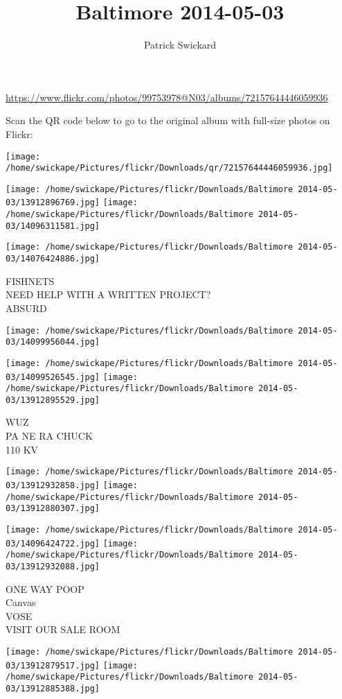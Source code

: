 \documentclass[10pt,letterpaper]{article}
\title{Baltimore 2014-05-03}
\author{Patrick Swickard}
\date{}
\begin{document}
\maketitle

\url{https://www.flickr.com/photos/99753978@N03/albums/72157644446059936}

Scan the QR code below to go to the original album with full-size photos on Flickr:

\texttt{[image: /home/swickape/Pictures/flickr/Downloads/qr/72157644446059936.jpg]}
\pagebreak

\texttt{[image: /home/swickape/Pictures/flickr/Downloads/Baltimore 2014-05-03/13912896769.jpg]}
\texttt{[image: /home/swickape/Pictures/flickr/Downloads/Baltimore 2014-05-03/14096311581.jpg]}

\texttt{[image: /home/swickape/Pictures/flickr/Downloads/Baltimore 2014-05-03/14076424886.jpg]}

FISHNETS\\
NEED HELP WITH A WRITTEN PROJECT?\\
ABSURD
\pagebreak

\texttt{[image: /home/swickape/Pictures/flickr/Downloads/Baltimore 2014-05-03/14099956044.jpg]}

\vspace{0.25in}
\texttt{[image: /home/swickape/Pictures/flickr/Downloads/Baltimore 2014-05-03/14099526545.jpg]}
\texttt{[image: /home/swickape/Pictures/flickr/Downloads/Baltimore 2014-05-03/13912895529.jpg]}

WUZ\\
PA NE RA CHUCK\\
110 KV
\pagebreak

\texttt{[image: /home/swickape/Pictures/flickr/Downloads/Baltimore 2014-05-03/13912932858.jpg]}
\texttt{[image: /home/swickape/Pictures/flickr/Downloads/Baltimore 2014-05-03/13912880307.jpg]}

\texttt{[image: /home/swickape/Pictures/flickr/Downloads/Baltimore 2014-05-03/14096424722.jpg]}
\texttt{[image: /home/swickape/Pictures/flickr/Downloads/Baltimore 2014-05-03/13912932088.jpg]}

ONE WAY POOP\\
Canvas\\
VOSE\\
VISIT OUR SALE ROOM
\pagebreak

\texttt{[image: /home/swickape/Pictures/flickr/Downloads/Baltimore 2014-05-03/13912879517.jpg]}
\texttt{[image: /home/swickape/Pictures/flickr/Downloads/Baltimore 2014-05-03/13912885388.jpg]}
\end{document}
